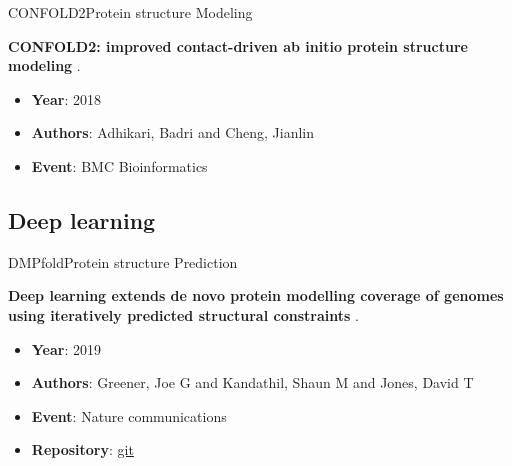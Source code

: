 \documentclass[10pt]{beamer}
\newcommand{\chref}[2]{	\href{#1}{{\usebeamercolor[bg]{Feather}#2}} }
\newcommand{\chref}[3][blue]{\href{#2}{\color{#1}{#3}}}%
\newcommand{\1}{
        	\setbeamertemplate{background}{
        		\texttt{[image: img/1]}
        		\tikz[overlay] \fill[fill opacity=0.75,fill=white] (0,0) rectangle (-\paperwidth,\paperheight);
        	}
}
\begin{document}
\begin{frame}{CONFOLD2}{Protein structure Modeling}
	
	\begin{block}{}
		\centering
		\textbf{CONFOLD2: improved contact-driven ab initio protein structure modeling} \cite{adhikari2018confold2}.
	\end{block}
	
	\begin{itemize}
		\item \textbf{Year}: 2018
		\item \textbf{Authors}: Adhikari, Badri and Cheng, Jianlin
		\item \textbf{Event}: BMC Bioinformatics
	\end{itemize}
\end{frame}

\subsection{Deep learning}

\begin{frame}{DMPfold}{Protein structure Prediction}
	
	\begin{block}{}
		\centering
		\textbf{Deep learning extends de novo protein modelling coverage of genomes using iteratively predicted structural constraints} \cite{greener2019deep}.
	\end{block}
	
	\begin{itemize}
		\item \textbf{Year}: 2019
		\item \textbf{Authors}: Greener, Joe G and Kandathil, Shaun M and Jones, David T
		\item \textbf{Event}: Nature communications
		\item \textbf{Repository}: \chref{https://github.com/psipred/DMPfold}{git} 
	\end{itemize}
\end{frame}
\end{document}
